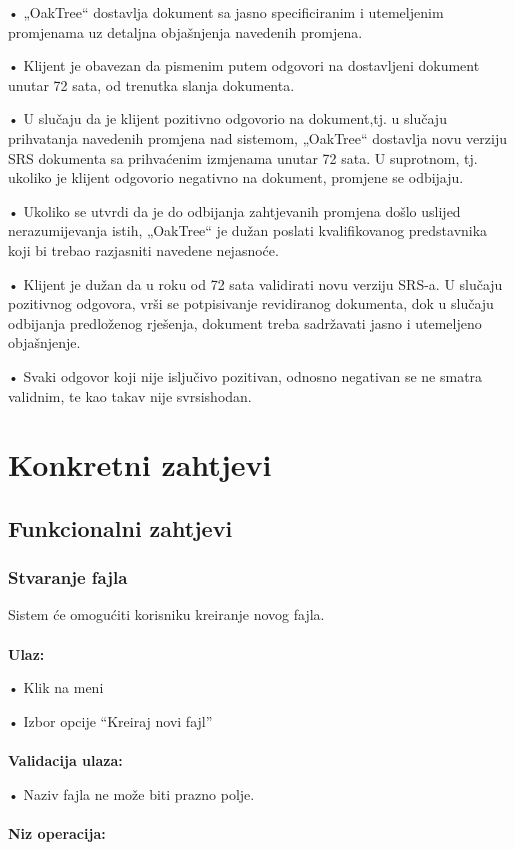 \documentclass[12pt]{article}
\begin{document}
•	„OakTree“ dostavlja dokument sa jasno specificiranim i utemeljenim promjenama uz detaljna objašnjenja navedenih promjena. 

•	Klijent je obavezan da pismenim putem odgovori na dostavljeni dokument unutar 72 sata, od trenutka slanja dokumenta.
 
•	U slučaju da  je klijent pozitivno odgovorio na dokument,tj. u slučaju prihvatanja navedenih promjena nad sistemom, „OakTree“ dostavlja novu verziju SRS dokumenta sa prihvaćenim izmjenama unutar 72 sata. U suprotnom, tj. ukoliko je klijent odgovorio negativno na dokument, promjene se odbijaju.  

•	Ukoliko se utvrdi da je do odbijanja zahtjevanih promjena došlo uslijed nerazumijevanja istih, „OakTree“ je dužan poslati kvalifikovanog predstavnika koji bi trebao razjasniti navedene nejasnoće.  

•	Klijent je dužan da u roku od 72 sata validirati novu verziju SRS-a. U slučaju pozitivnog odgovora, vrši se potpisivanje revidiranog dokumenta, dok u slučaju odbijanja predloženog rješenja, dokument treba sadržavati jasno i utemeljeno objašnjenje.  

•	Svaki odgovor koji nije isljučivo pozitivan, odnosno negativan se ne smatra validnim, te kao takav nije svrsishodan. 

\section{Konkretni zahtjevi}
\subsection{Funkcionalni zahtjevi}
\subsubsection{Stvaranje fajla}

Sistem će omogućiti korisniku kreiranje novog fajla.\\ \\
\textbf{Ulaz:}

•	Klik na meni

•	Izbor opcije “Kreiraj novi fajl” \\ \\
\textbf{Validacija ulaza:}

•	Naziv fajla ne može biti prazno polje.\\ \\
\textbf{Niz operacija:}
\end{document}
